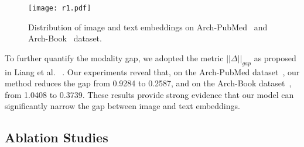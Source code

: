 \begin{figure}[!h]
  \centering
\texttt{[image: r1.pdf]}
   \caption{Distribution of image and text embeddings on Arch-PubMed~\cite{seyfioglu2024quilt} and Arch-Book~\cite{seyfioglu2024quilt} dataset.}
   \label{fig:onecol}
\vspace{-2ex}
\end{figure}
To further quantify the modality gap, we adopted the metric $||\Delta||_{gap}$ 
as proposed in Liang et al. ~\cite{liang2022mind}. Our experiments reveal that, on the Arch-PubMed dataset~\cite{seyfioglu2024quilt}, our method reduces the gap from 0.9284 to 0.2587, and on the Arch-Book dataset~\cite{seyfioglu2024quilt}, from 1.0408 to 0.3739. These results provide strong evidence that our model can significantly narrow the gap between image and text embeddings.
\subsection{Ablation Studies}

